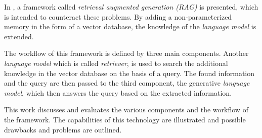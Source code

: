 \documentclass{article}
\begin{document}
In \cite{RAG}, a framework called \textit{retrieval augmented generation (RAG)} is presented, which is intended to counteract these problems. By adding a non-parameterized memory in the form of a vector database, the knowledge of the \textit{language model} is extended. 

The workflow of this framework is defined by three main components. Another \textit{language model} which is called \textit{retriever}, is used to search the additional knowledge in the vector database on the basis of a query. The found information and the query are then passed to the third component, the generative \textit{language model}, which then answers the query based on the extracted information.

This work discusses and evaluates the various components and the workflow of the framework. The capabilities of this technology are illustrated and possible drawbacks and problems are outlined.

\newpage


\end{document}
